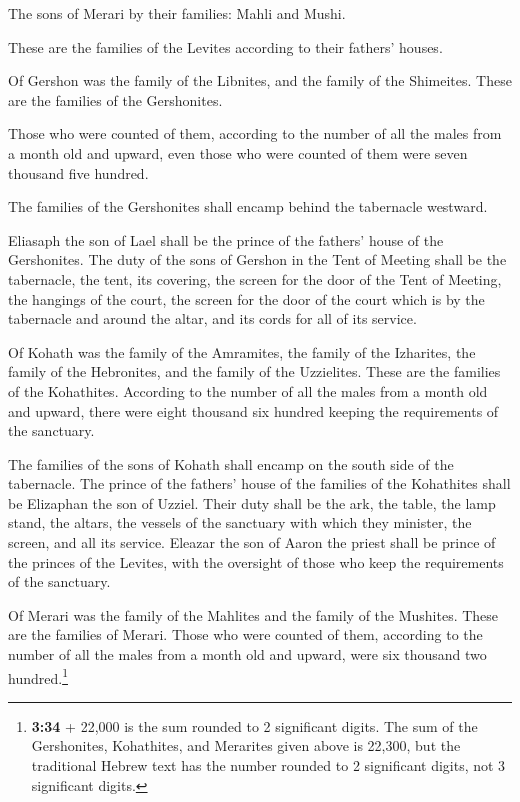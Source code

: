  The sons of Merari by their families: Mahli and Mushi.

These are the families of the Levites according to their fathers'
houses.

 Of Gershon was the family of the Libnites, and the
family of the Shimeites. These are the families of the Gershonites.

 Those who were counted of them, according to the number
of all the males from a month old and upward, even those who were
counted of them were seven thousand five hundred.

 The families of the Gershonites shall encamp behind the
tabernacle westward.

 Eliasaph the son of Lael shall be the prince of the
fathers' house of the Gershonites.  The duty of the sons
of Gershon in the Tent of Meeting shall be the tabernacle, the tent, its
covering, the screen for the door of the Tent of Meeting,
 the hangings of the court, the screen for the door of
the court which is by the tabernacle and around the altar, and its cords
for all of its service.

 Of Kohath was the family of the Amramites, the family of
the Izharites, the family of the Hebronites, and the family of the
Uzzielites. These are the families of the Kohathites. 
According to the number of all the males from a month old and upward,
there were eight thousand six hundred keeping the requirements of the
sanctuary.

 The families of the sons of Kohath shall encamp on the
south side of the tabernacle.  The prince of the fathers'
house of the families of the Kohathites shall be Elizaphan the son of
Uzziel.  Their duty shall be the ark, the table, the lamp
stand, the altars, the vessels of the sanctuary with which they
minister, the screen, and all its service.  Eleazar the
son of Aaron the priest shall be prince of the princes of the Levites,
with the oversight of those who keep the requirements of the sanctuary.

 Of Merari was the family of the Mahlites and the family
of the Mushites. These are the families of Merari.  Those
who were counted of them, according to the number of all the males from
a month old and upward, were six thousand two hundred.\footnote{\textbf{3:34}
  + 22,000 is the sum rounded to 2 significant digits. The sum of the
  Gershonites, Kohathites, and Merarites given above is 22,300, but the
  traditional Hebrew text has the number rounded to 2 significant
  digits, not 3 significant digits.}

